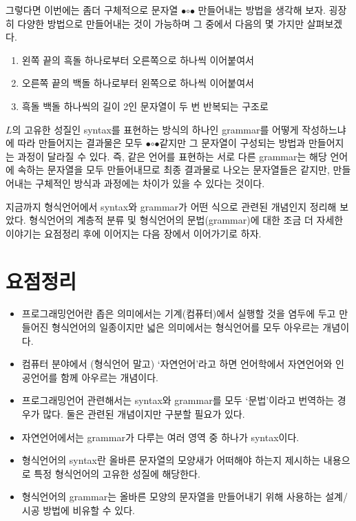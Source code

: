\documentclass[b5paper,chapter,figtabcapt]{oblivoir}
\newcommand{\txtbullet}[0]{\ensuremath{\bullet}}
\newcommand{\txtcircle}[0]{\ensuremath{\circ}}
\begin{document}
그렇다면 이번에는 좀더 구체적으로 문자열 \txtbullet\txtcircle\txtbullet{}
만들어내는 방법을 생각해 보자. 굉장히 다양한 방법으로 만들어내는 것이 가능하며
그 중에서 다음의 몇 가지만 살펴보겠다.
\begin{enumerate}
    \item
    \fbox{\fbox{\fbox{\fbox{\!\txtbullet\!}\,\txtcircle\!}\,\txtbullet\!}\,\txtcircle\!}
    왼쪽 끝의 흑돌 하나로부터 오른쪽으로 하나씩 이어붙여서
    \item
    \fbox{\!\txtbullet\,\fbox{\!\txtcircle\,\fbox{\!\txtbullet\,\fbox{\!\txtcircle\!}}}}
    오른쪽 끝의 백돌 하나로부터 왼쪽으로 하나씩 이어붙여서
    \item
    \fbox{\fbox{\!\fbox{\!\txtbullet\!}\,\txtcircle\!}\,\fbox{\!\fbox{\!\txtbullet\!}\,\txtcircle\!}}
    흑돌 백돌 하나씩의 길이 2인 문자열이 두 번 반복되는 구조로
\end{enumerate}
$L$의 고유한 성질인 syntax를 표현하는 방식의 하나인 grammar를 어떻게 작성하느냐에
따라 만들어지는 결과물은 모두 \txtbullet\txtcircle\txtbullet{} 같지만
그 문자열이 구성되는 방법과 만들어지는 과정이 달라질 수 있다. 즉, 같은 언어를 표현하는
서로 다른 grammar는 해당 언어에 속하는 문자열을 모두 만들어내므로 최종 결과물로 나오는
문자열들은 같지만, 만들어내는 구체적인 방식과 과정에는 차이가 있을 수 있다는 것이다.

지금까지 형식언어에서 syntax와 grammar가 어떤 식으로 관련된 개념인지 정리해 보았다.
형식언어의 계층적 분류 및 형식언어의 문법(grammar)에 대한 조금 더 자세한 이야기는
요점정리 후에 이어지는 다음 장에서 이어가기로 하자.

\section*{요점정리}
\begin{itemize}
    \item 프로그래밍언어란 좁은 의미에서는 기계(컴퓨터)에서 실행할 것을
    염두에 두고 만들어진 형식언어의 일종이지만 넓은 의미에서는 형식언어를
    모두 아우르는 개념이다.
    \item
    컴퓨터 분야에서 (형식언어 말고) `자연언어'라고 하면
    언어학에서 자연언어와 인공언어를 함께 아우르는 개념이다.
    \item
    프로그래밍언어 관련해서는 syntax와 grammar를 모두 `문법'이라고
    번역하는 경우가 많다. 둘은 관련된 개념이지만 구분할 필요가 있다.
    \item
    자연언어에서는 grammar가 다루는 여러 영역 중 하나가 syntax이다.
    \item
    형식언어의 syntax란 올바른 문자열의 모양새가 어떠해야 하는지 제시하는
    내용으로 특정 형식언어의 고유한 성질에 해당한다.
    \item
    형식언어의 grammar는 올바른 모양의 문자열을 만들어내기 위해
    사용하는 설계/시공 방법에 비유할 수 있다.
\end{itemize}
\end{document}
